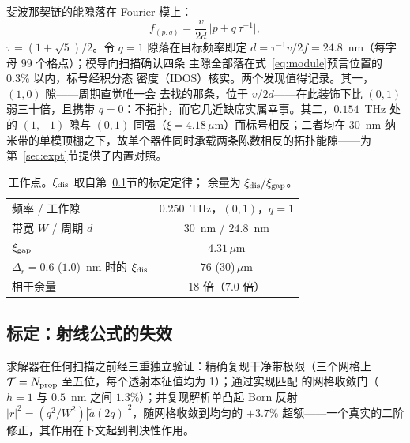 \documentclass[11pt]{article}
\begin{document}
斐波那契链的能隙落在 Fourier 模上：
\begin{equation}
f_{(p,q)} = \frac{v}{2d}\,\bigl|p + q\,\tau^{-1}\bigr|,
\label{eq:module}
\end{equation}
$\tau = (1+\sqrt5)/2$。令 $q = 1$ 隙落在目标频率即定
$d = \tau^{-1} v/2f = 24.8$~nm（每字母 $99$ 个格点）；模导向扫描确认四条
主隙全部落在式~\eqref{eq:module}预言位置的 $0.3\%$ 以内，标号经积分态
密度（IDOS）核实。两个发现值得记录。其一，$(1,0)$ 隙——周期直觉唯一会
去找的那条，位于 $v/2d$——在此装饰下比 $(0,1)$ 弱三十倍，且携带
$q = 0$：不拓扑，而它几近缺席实属幸事。其二，$0.154$~THz 处的 $(1,-1)$
隙与 $(0,1)$ 同强（$\xi = 4.18\,\mu$m）而标号相反；二者均在 $30$~nm
纳米带的单模顶棚之下，故单个器件同时承载两条陈数相反的拓扑能隙——为
第~\ref{sec:expt}节提供了内置对照。

\begin{table}[H]
\centering
\caption{工作点。$\xi_{\rm dis}$ 取自第~\ref{sec:calib}节的标定定律；
余量为 $\xi_{\rm dis}/\xi_{\rm gap}$。}
\begin{tabular}{lc}
\hline\hline
频率 / 工作隙 & $0.250$~THz，$(0,1)$，$q = 1$\\
带宽 $W$ / 周期 $d$ & $30$~nm / $24.8$~nm\\
$\xi_{\rm gap}$ & $4.31\,\mu$m\\
$\Delta_r = 0.6$ ($1.0$)~nm 时的 $\xi_{\rm dis}$ & $76$ ($30$)\,$\mu$m\\
相干余量 & $18$ 倍（$7.0$ 倍）\\
\hline\hline
\end{tabular}
\end{table}

\subsection{标定：射线公式的失效}
\label{sec:calib}

求解器在任何扫描之前经三重独立验证：精确复现干净带极限（三个网格上
$\mathcal{T} = N_{\rm prop}$ 至五位，每个透射本征值均为 1）；通过实现匹配
的网格收敛门（$h = 1$ 与 $0.5$~nm 之间 $1.3\%$）；并复现解析单凸起 Born
反射 $|r|^2 = (q^2/W^2)|\tilde a(2q)|^2$，随网格收敛到均匀的 $+3.7\%$
超额——一个真实的二阶修正，其作用在下文起到判决性作用。
\end{document}
